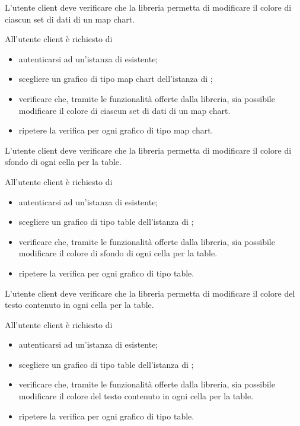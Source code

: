 	L'utente client deve verificare che la libreria permetta di modificare il colore di ciascun set di dati di un map chart.
		
		All'utente client è richiesto di
		\begin{itemize}
			\item autenticarsi ad un'istanza di \projectname{} esistente;
			\item scegliere un grafico di tipo map chart dell'istanza di \projectname{};
			\item verificare che, tramite le funzionalità offerte dalla libreria, sia possibile modificare il colore di ciascun set di dati di un map chart.
			\item ripetere la verifica per ogni grafico di tipo map chart.
		\end{itemize}

	L'utente client deve verificare che la libreria permetta di modificare il colore di sfondo di ogni cella per la table.
		
		All'utente client è richiesto di
		\begin{itemize}
			\item autenticarsi ad un'istanza di \projectname{} esistente;
			\item scegliere un grafico di tipo table dell'istanza di \projectname{};
			\item verificare che, tramite le funzionalità offerte dalla libreria, sia possibile modificare il colore di sfondo di ogni cella per la table.
			\item ripetere la verifica per ogni grafico di tipo table.
		\end{itemize}

	L'utente client deve verificare che la libreria permetta di modificare il colore del testo contenuto in ogni cella per la table.
		
		All'utente client è richiesto di
		\begin{itemize}
			\item autenticarsi ad un'istanza di \projectname{} esistente;
			\item scegliere un grafico di tipo table dell'istanza di \projectname{};
			\item verificare che, tramite le funzionalità offerte dalla libreria, sia possibile modificare il colore del testo contenuto in ogni cella per la table.
			\item ripetere la verifica per ogni grafico di tipo table.
		\end{itemize}

